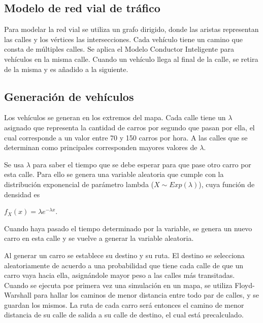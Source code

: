 \documentclass[colorinlistoftodos,twoside,twocolumn]{article} %
\begin{document}
	\subsection{Modelo de red vial de tráfico}
	
	Para modelar la red vial se utiliza un grafo dirigido, donde las aristas representan las calles y los vértices las intersecciones. Cada vehículo tiene un camino que consta de múltiples calles. Se aplica el Modelo Conductor Inteligente para vehículos en la misma calle. Cuando un vehículo llega al final de la calle, se retira de la misma y es añadido a la siguiente.
	
	\subsection{Generación de vehículos}
	
	Los veh\'iculos se generan en los extremos del mapa. Cada calle tiene un $\lambda$ asignado que representa la cantidad de carros por segundo que pasan por ella, el cual corresponde a un valor entre 70 y 150 carros por hora. A las calles que se determinan como principales corresponden mayores valores de $\lambda$.
	
	Se usa $\lambda$ para saber el tiempo que se debe esperar para que pase otro carro por esta calle. Para ello se genera una variable aleatoria que cumple con la distribuci\'on  exponencial de par\'ametro lambda ($X \sim Exp(\lambda)$), cuya funci\'on de densidad es
	\begin{center}
		$f_X(x) = \lambda e^{-\lambda x}.$
	\end{center}

	Cuando haya pasado el tiempo determinado por la variable, se genera un nuevo carro en esta calle y se vuelve a generar la variable aleatoria.
	
	Al generar un carro se establece su destino y su ruta. El destino se selecciona aleatoriamente de acuerdo a una probabilidad que tiene cada calle de que un carro vaya hacia ella, asign\'andole mayor peso a las calles m\'as transitadas. Cuando se ejecuta por primera vez una simulaci\'on en un mapa, se utiliza Floyd-Warshall para hallar los caminos de menor distancia entre todo par de calles, y se guardan los mismos. La ruta de cada carro ser\'a entonces el camino de menor distancia de su calle de salida a su calle de destino, el cual est\'a precalculado.
	
	
\end{document}
